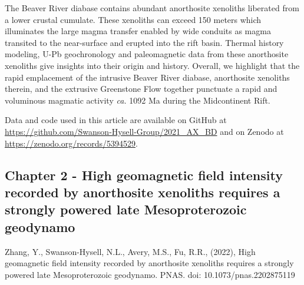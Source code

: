 \documentclass{ucbthesis}
\begin{document}
\begin{frontmatter}
The Beaver River diabase contains abundant anorthosite xenoliths liberated from a lower crustal cumulate. These xenoliths can exceed 150 meters which illuminates the large magma transfer enabled by wide conduits as magma transited to the near-surface and erupted into the rift basin. Thermal history modeling, U-Pb geochronology and paleomagnetic data from these anorthosite xenoliths give insights into their origin and history. Overall, we highlight that the rapid emplacement of the intrusive Beaver River diabase, anorthosite xenoliths therein, and the extrusive Greenstone Flow together punctuate a rapid and voluminous magmatic activity \textit{ca.} 1092 Ma during the Midcontinent Rift. 

Data and code used in this article are available on GitHub at \url{https://github.com/Swanson-Hysell-Group/2021_AX_BD} and on Zenodo at \url{https://zenodo.org/records/5394529}. 


\subsection{Chapter 2 - High geomagnetic field intensity recorded by anorthosite xenoliths requires a strongly powered late Mesoproterozoic geodynamo}

Zhang, Y., Swanson-Hysell, N.L., Avery, M.S., Fu, R.R., (2022), High geomagnetic field intensity recorded by anorthosite xenoliths requires a strongly powered late Mesoproterozoic geodynamo. PNAS. doi: 10.1073/pnas.2202875119
\\


\end{frontmatter}
\end{document}
